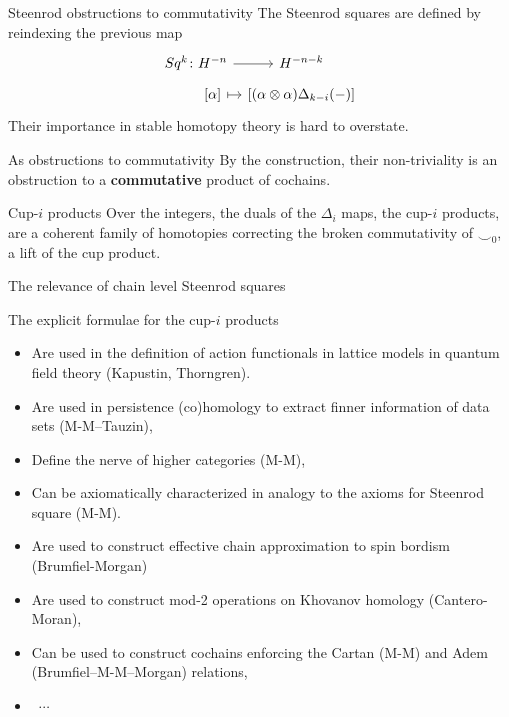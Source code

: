 \documentclass[10pt,t]{beamer}
\begin{document}
\begin{frame}[fragile]{Steenrod obstructions to commutativity}
	The Steenrod squares are defined by reindexing the previous map
	\begin{equation*}
	\begin{tikzcd}[row sep=tiny, column sep=tiny]
	Sq^k \colon H^{-n} \arrow[r] & H^{-n-k} \\
	\phantom{Sq^k \colon}{[\alpha]} \arrow[r, |->] & {\left[(\alpha \otimes \alpha)\Delta_{k-i}(-) \right]}
	\end{tikzcd}
	\end{equation*}
	Their importance in stable homotopy theory is hard to overstate.
	
	\begin{block}{As obstructions to commutativity}
		By the construction, their non-triviality is an obstruction to a \textbf{commutative} product of cochains.
	\end{block}

	\begin{block}{Cup-$i$ products}
		Over the integers, the duals of the $\Delta_i$ maps, the cup-$i$ products, are a coherent family of homotopies correcting the broken commutativity of $\smallsmile_0$, a lift of the cup product.
	\end{block}
\end{frame}


\begin{frame}{The relevance of chain level Steenrod squares}
	
	The explicit formulae for the cup-$i$ products	
	\begin{itemize}
		\item Are used in the definition of action functionals in lattice models in quantum field theory (Kapustin, Thorngren).
		\item Are used in persistence (co)homology to extract finner information of data sets (M-M--Tauzin),
		\item Define the nerve of higher categories (M-M),
		\item Can be axiomatically characterized in analogy to the axioms for Steenrod square (M-M).
		\item Are used to construct effective chain approximation to spin bordism (Brumfiel-Morgan)
		\item Are used to construct mod-2 operations on Khovanov homology (Cantero-Moran),
		\item Can be used to construct cochains enforcing the Cartan (M-M) and Adem (Brumfiel--M-M--Morgan) relations,
		\item \ $\cdots$
	\end{itemize}
\end{frame}
\end{document}
